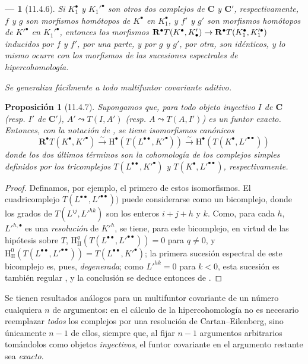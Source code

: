\documentclass[10pt,oneside,openany]{book}
\theoremstyle{egaenv}\newtheorem*{env}{---}
\theoremstyle{egastatement}
\newtheorem*{proposition}{Proposición}
\theoremstyle{egadescription}
\renewcommand{\to}{\mathchoice{\longrightarrow}{\rightarrow}{\rightarrow}{\rightarrow}}
\begin{document}
\begin{env}[11.4.6]
Si $K_1^\bullet$ y $K_1'^\bullet$ son otros dos complejos de $\boldsymbol{C}$ y $\boldsymbol{C}'$, respectivamente, $f$ y $g$ son morfismos \emph{homótopos} de $K^\bullet$ en $K_1^\bullet$,
y $f'$ y $g'$ son morfismos \emph{homótopos} de $K'^\bullet$ en $K_1'^\bullet$, entonces los morfismos $\mathbf R^\bullet T(K^\bullet,K'_\bullet)\to
\mathbf R^\bullet T(K_1^\bullet,K_1'^\bullet)$ inducidos por $f$ y $f'$, por una parte, y por $g$ y $g'$, por otra, son idénticos, y lo mismo ocurre con los morfismos de las sucesiones espectrales de hipercohomología.

Se generaliza fácilmente a todo multifuntor covariante aditivo.
\end{env}

\begin{proposition}[11.4.7]
\label{0.11.4.7}
\label{0.11.4.7-fr}
Supongamos que, para todo objeto inyectivo $I$ de $\boldsymbol{C}$ \textup{(resp.} $I'$ de $\boldsymbol{C}'$), $A'\leadsto T(I,A')$ \textup{(resp.} $A\leadsto T(A,I')$) es un funtor exacto.
Entonces, con la notación de , se tiene isomorfismos canónicos
\[
  \label{0.11.4.7.1-fr}
  \mathbf R^\bullet T(K^\bullet,K'^\bullet)
  \xrightarrow{\sim}\mathrm H^\bullet(T(L^{\bullet\bullet},K'^\bullet))
  \xrightarrow{\sim}\mathrm H^\bullet(T(K^\bullet,L'^{\bullet\bullet}))
  \tag{11.4.7.1}
\]
donde los dos últimos términos son la cohomología de los complejos simples definidos por los tricomplejos $T(L^{\bullet\bullet},K'^\bullet)$ y $T(K^\bullet,L'^{\bullet\bullet})$, respectivamente.
\end{proposition}

\begin{proof}
Definamos, por ejemplo, el primero de estos isomorfismos.
El cuadricomplejo $T(L^{\bullet\bullet},L'^{\bullet\bullet}))$ puede considerarse como un bicomplejo, donde los grados de $T(L^{ij},L'^{hk})$ son los enteros $i+j+h$ y $k$.
Como, para cada $h$, $L'^{h,\bullet}$ es una \emph{resolución} de $K'^h$, se tiene, para este bicomplejo, en virtud de las hipótesis sobre $T$, $\mathrm H_{\mathrm{II}}^q(T(L^{\bullet\bullet},L'^{\bullet\bullet}))=0$ para $q\neq0$, y $\mathrm H_{\mathrm{II}}^0(T(L^{\bullet\bullet},L'^{\bullet\bullet}))
=T(L^{\bullet\bullet},K'^\bullet)$;
la primera sucesión espectral de este bicomplejo es, pues, \emph{degenerada};
como $L'^{hk}=0$ para $k<0$, esta sucesión es también regular , y la conclusión se deduce entonces de .
\end{proof}

Se tienen resultados análogos para un multifuntor covariante de un número cualquiera $n$ de argumentos: en el cálculo de la hipercohomología no es necesario reemplazar \emph{todos} los complejos
por una resolución de Cartan--Eilenberg, sino únicamente $n-1$ de ellos, siempre que, al fijar $n-1$ argumentos arbitrarios tomándolos como objetos \emph{inyectivos}, el funtor covariante en el argumento restante sea \emph{exacto}.
\end{document}
